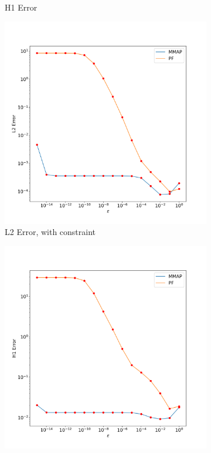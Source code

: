\documentclass[12pt]{ociamthesis}
\begin{document}
\begin{figure}[H]
\begin{subfigure}{0.44\textwidth}
     \caption{H1 Error}
 \end{subfigure}
 \begin{subfigure}{0.44\textwidth}
     \includegraphics[width=\textwidth]{Pics/LHSims/E2/E2_INL2.png}
     \caption{L2 Error, with constraint}
 \end{subfigure}
 \begin{subfigure}{0.44\textwidth}
     \includegraphics[width=\textwidth]{Pics/LHSims/E2/E2_INH1.png}

\end{subfigure}
\end{figure}
\end{document}
